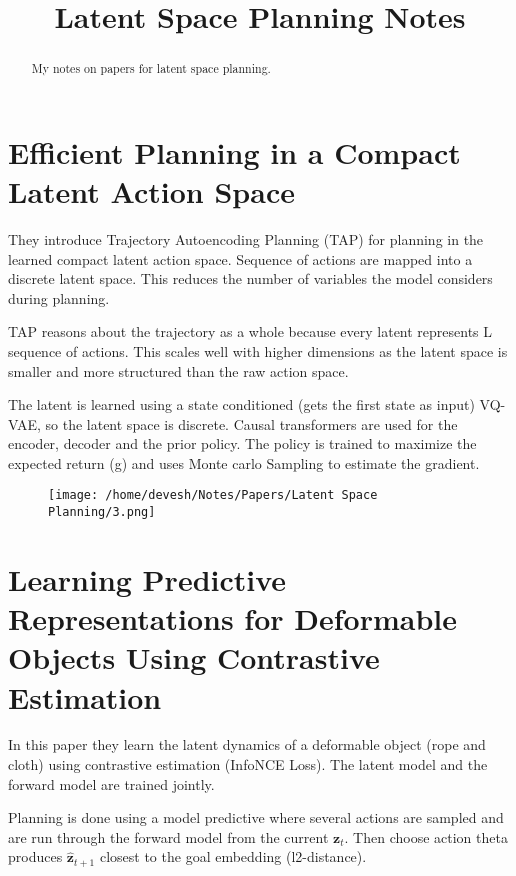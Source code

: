 \documentclass[12pt]{article}
\begin{document}
\title{Latent Space Planning Notes}
\author{}
\date{}

\maketitle

\begin{abstract}
My notes on papers for latent space planning.
\end{abstract}

\section{Efficient Planning in a Compact Latent Action Space}
They introduce Trajectory Autoencoding Planning (TAP) for planning in the learned compact latent action space. Sequence of actions are mapped into a discrete latent space. This reduces the number of variables the model considers during planning. 

TAP reasons about the trajectory as a whole because every latent represents L sequence of actions. This scales well with higher dimensions as the latent space is smaller and more structured than the raw action space.

The latent is learned using a state conditioned (gets the first state as input) VQ-VAE, so the latent space is discrete. Causal transformers are used for the encoder, decoder and the prior policy. The policy is trained to maximize the expected return (g) and uses Monte carlo Sampling to estimate the gradient.

\begin{figure}[ht]
    \centering
    \texttt{[image: /home/devesh/Notes/Papers/Latent Space Planning/3.png]}
    \caption{}
    \label{fig:tap}
\end{figure}

\newpage
\section{Learning Predictive Representations for Deformable Objects Using Contrastive Estimation}
In this paper they learn the latent dynamics of a deformable object (rope and cloth) using contrastive estimation (InfoNCE Loss). The latent model and the forward model are trained jointly.

Planning is done using a model predictive where several actions are sampled and are run through the forward model from the current \(\mathbf{z}_{t}\). Then choose action theta produces \(\hat{\mathbf{z}}_{t+1}\) closest to the goal embedding (l2-distance).
\end{document}
